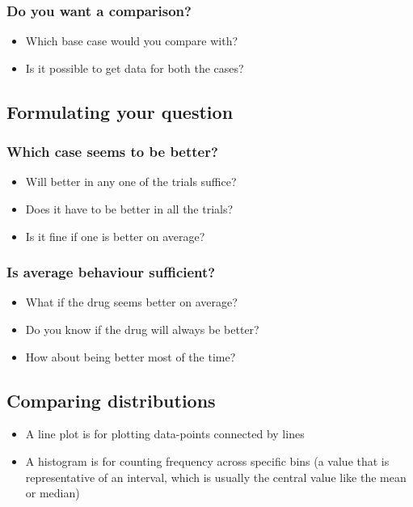 \documentclass[11pt]{article}
\begin{document}
\subsubsection{Do you want a comparison?}
\label{sec:orga286027}
\begin{itemize}
\item Which base case would you compare with?
\item Is it possible to get data for both the cases?
\end{itemize}

\subsection{Formulating your question}
\label{sec:orgbd0b64c}

\subsubsection{Which case seems to be better?}
\label{sec:orgbe5b086}
\begin{itemize}
\item Will better in any one of the trials suffice?
\item Does it have to be better in all the trials?
\item Is it fine if one is better on average?
\end{itemize}

\subsubsection{Is average behaviour sufficient?}
\label{sec:orge2c8e6f}
\begin{itemize}
\item What if the drug seems better on average?
\item Do you know if the drug will always be better?
\item How about being better most of the time?
\end{itemize}

\subsection{Comparing distributions}
\label{sec:org17d7a42}
\begin{itemize}
\item A line plot is for plotting data-points connected by lines
\item A histogram is for counting frequency across specific bins (a value that is representative of an interval, which is usually the central value like the mean or median)
\end{itemize}
\end{document}
